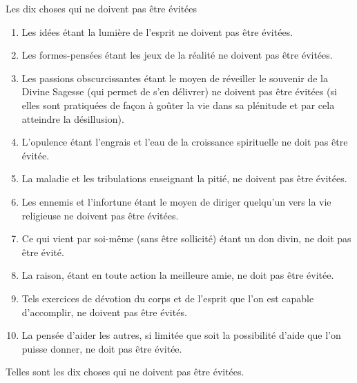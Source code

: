 \documentclass[10pt]{book}
\makeatletter
\renewcommand{\section}{\@startsection{section}{0}{0mm}
   {\baselineskip}
   {\baselineskip}{\normalfont\normalsize\scshape\centering}
}
\makeatother
\begin{document}
\section{Les dix choses qui ne doivent pas être évitées}
\begin{enumerate}[1.-]
\item Les idées étant la lumière de l'esprit ne doivent pas être évitées.
\item Les formes-pensées étant les jeux de la réalité ne doivent pas être évitées.
\item Les passions obscurcissantes étant le moyen de réveiller le souvenir de la Divine Sagesse (qui permet de s'en délivrer) ne doivent pas être évitées (si elles sont pratiquées de façon à goûter la vie dans sa plénitude et par cela atteindre la désillusion).
\item L'opulence étant l'engrais et l'eau de la croissance spirituelle ne doit pas être évitée.
\item La maladie et les tribulations enseignant la pitié, ne doivent pas être évitées.
\item Les ennemis et l'infortune étant le moyen de diriger quelqu'un vers la vie religieuse ne doivent pas être évitées.
\item Ce qui vient par soi-même (sans être sollicité) étant un don divin, ne doit pas être évité.
\item La raison, étant en toute action la meilleure amie, ne doit pas être évitée.
\item Tels exercices de dévotion du corps et de l'esprit que l'on est capable d'accomplir, ne doivent pas être évités.
\item La pensée d'aider les autres, si limitée que soit la possibilité d'aide que l'on puisse donner, ne doit pas être évitée.
\end{enumerate}
Telles sont les dix choses qui ne doivent pas être évitées.
\end{document}
